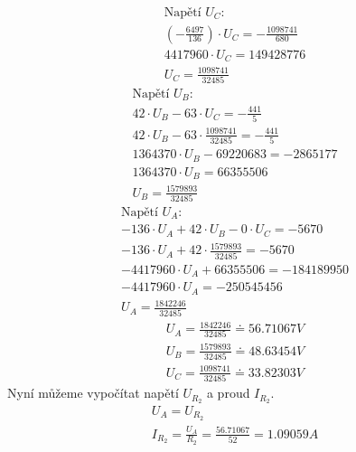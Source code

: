     \begin{gather*}
    \text{Napětí ${U_C}$:} \\
	(-\frac{6497}{136}) \cdot U_C  = -\frac{1098741}{680} \\
	4417960 \cdot U_C = 149428776 \\
	U_C = \frac{1098741}{32485}
	\end{gather*}
	\begin{gather*}
    \text{Napětí ${U_B}$:} \\
    42 \cdot U_B - 63 \cdot U_C  = -\frac{441}{5} \\
    42 \cdot U_B - 63 \cdot \frac{1098741}{32485}  = -\frac{441}{5} \\
    1364370 \cdot U_B - 69220683 = -2865177 \\
    1364370 \cdot U_B = 66355506 \\
    U_B = \frac{1579893}{32485}
	\end{gather*}
	\begin{gather*}
    \text{Napětí ${U_A}$:} \\
    -136 \cdot U_A + 42 \cdot U_B - 0 \cdot U_C  = -5670 \\
    -136 \cdot U_A + 42 \cdot \frac{1579893}{32485}  = -5670 \\
    -4417960 \cdot U_A + 66355506 = -184189950 \\
    -4417960 \cdot U_A = -250545456 \\
    U_A = \frac{1842246}{32485}
	\end{gather*}
	\begin{gather*}
    U_A = \frac{1842246}{32485} \doteq 56.71067V\\
    U_B = \frac{1579893}{32485} \doteq 48.63454V\\
    U_C = \frac{1098741}{32485} \doteq 33.82303V
	\end{gather*}
	Nyní můžeme vypočítat napětí $U_{R_{2}}$ a proud $I_{R_{2}}$.
	\begin{gather*}
	U_{A} = U_{R_{2}}\\
	I_{R_{2}} =\frac{U_A}{R_2} = \frac{56.71067}{52} = 1.09059A \\
	\end{gather*}